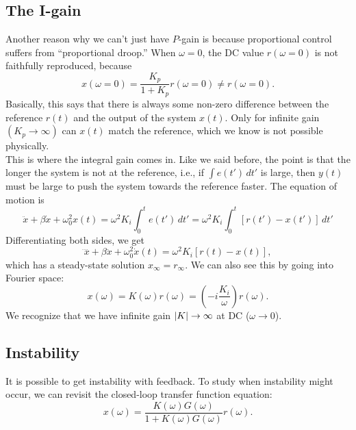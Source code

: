 \documentclass{article}
\theoremstyle{definition}
\newcommand{\f}[2]{\frac{#1}{#2}}
\newcommand{\lp}{\left(}
\newcommand{\rp}{\right)}
\begin{document}
\subsection{The I-gain}

Another reason why we can't just have $P$-gain is because proportional control suffers from ``proportional droop.'' When $\omega=0$, the DC value $r(\omega=0)$ is not faithfully reproduced, because 
\begin{equation*}
x(\omega=0) = \f{K_p}{1+K_p}r(\omega=0) \neq r(\omega=0).
\end{equation*}
Basically, this says that there is always some non-zero difference between the reference $r(t)$ and the output of the system $x(t)$. Only for infinite gain $(K_p \to \infty)$ can $x(t)$ match the reference, which we know is not possible physically. \\

This is where the integral gain comes in. Like we said before, the point is that the longer the system is not at the reference, i.e., if $\int e(t')\,dt'$ is large, then $y(t)$ must be large to push the system towards the reference faster. The equation of motion is 
\begin{equation*}
\ddot{x} + \beta \dot{x} + \omega_0^2 x(t) = \omega^2 K_i  \int_0^t e(t')\,dt' = \omega^2 K_i  \int_0^t [r(t') - x(t')]\,dt'
\end{equation*}
Differentiating both sides, we get
\begin{equation*}
\ddddot{x} + \beta \ddot{x} + \omega_0^2 \dot{x}(t) = \omega^2 K_i [ r(t) -x(t) ],
\end{equation*}
which has a steady-state solution $x_\infty = r_\infty$. We can also see this by going into Fourier space:
\begin{equation*}
x(\omega) = K(\omega) r(\omega) = \lp -i \f{K_i}{\omega} \rp r(\omega).
\end{equation*}
We recognize that we have infinite gain $\abs{K} \to \infty$ at DC ($\omega\to 0$). 


\subsection{Instability}

It is possible to get instability with feedback. To study when instability might occur, we can revisit the closed-loop transfer function equation:
\begin{equation*}
x(\omega) = \f{K(\omega) G(\omega)}{1+ K(\omega)G(\omega)} r(\omega).
\end{equation*}
\end{document}
